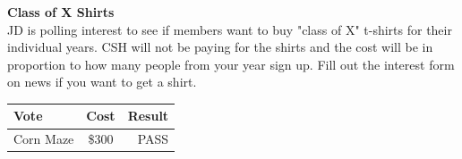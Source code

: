 \documentclass[9pt]{extarticle} %
\begin{document}
\begin{minipage}[t]{.35\linewidth}
\begin{mdframed}[style=sidebar,frametitle={}]


\textbf{Class of X Shirts} \\
JD is polling interest to see if members want to buy "class of X" 
t-shirts for their individual years. CSH will not be paying for the
shirts and the cost will be in proportion to how many people from your
year sign up. Fill out the interest form on news if you want to get a 
shirt. \\


\begin{tabular}{lcr}

Vote & Cost & Result \\
\midrule
Corn Maze & \$300 & PASS \\
\bottomrule
\end{tabular}


\end{mdframed}
\end{minipage}\hfill %
%
%
\end{document}
